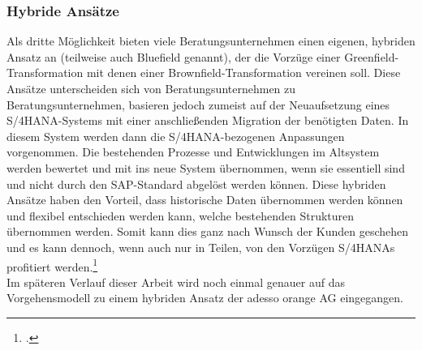 \subsubsection{Hybride Ansätze}
Als dritte Möglichkeit bieten viele Beratungsunternehmen einen eigenen, hybriden Ansatz an (teilweise auch \glqq{}Bluefield\grqq{} genannt), der die Vorzüge einer Greenfield-Transformation mit denen einer Brownfield-Transformation vereinen soll. Diese Ansätze unterscheiden sich von Beratungsunternehmen zu Beratungsunternehmen, basieren jedoch zumeist auf der Neuaufsetzung eines S/4HANA-Systems mit einer anschließenden Migration der benötigten Daten. In diesem System werden dann die S/4HANA-bezogenen Anpassungen vorgenommen. Die bestehenden Prozesse und Entwicklungen im Altsystem werden bewertet und mit ins neue System übernommen, wenn sie essentiell sind und nicht durch den SAP-Standard abgelöst werden können. Diese hybriden Ansätze haben den Vorteil, dass historische Daten übernommen werden können und flexibel entschieden werden kann, welche bestehenden Strukturen übernommen werden. Somit kann dies ganz nach Wunsch der Kunden geschehen und es kann dennoch, wenn auch nur in Teilen, von den Vorzügen S/4HANAs profitiert werden.\footcite[Vgl.][]{hybrideransatz}\\
Im späteren Verlauf dieser Arbeit wird noch einmal genauer auf das Vorgehensmodell zu einem hybriden Ansatz der \glqq{}adesso orange AG\grqq{} eingegangen.
